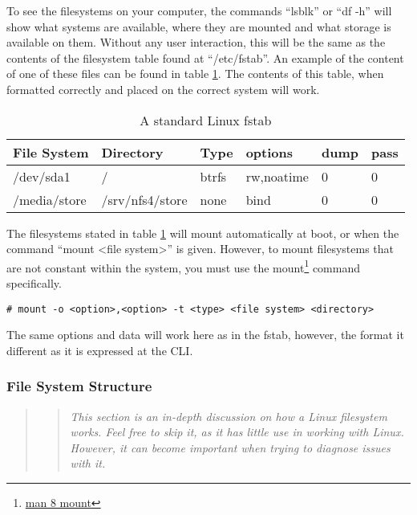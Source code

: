				To see the filesystems on your computer, the commands ``lsblk'' or ``df -h'' will show what systems are available, where they are mounted and what storage is available on them.
				Without any user interaction, this will be the same as the contents of the filesystem table found at ``/etc/fstab''.
				An example of the content of one of these files can be found in table \ref{tab:fstab}.
				The contents of this table, when formatted correctly and placed on the correct system will work.
				\begin{table}[htb]
					\centering
				\begin{adjustbox}{max width=1\textwidth}
					\begin{tabular}{l l l l l l }
						\toprule
						\textbf{File System} & \textbf{Directory} & \textbf{Type} & \textbf{options} & \textbf{dump} & \textbf{pass} \\
						\toprule
						/dev/sda1 & / & btrfs & rw,noatime & 0 & 0 \\
						/media/store & /srv/nfs4/store & none & bind & 0 & 0 \\
						\bottomrule
					\end{tabular}
				\end{adjustbox}
					\label{tab:fstab}
					\caption{A standard Linux fstab}
				\end{table}
				The filesystems stated in table \ref{tab:fstab} will mount automatically at boot, or when the command ``mount <file system>'' is given.
				However, to mount filesystems that are not constant within the system, you must use the mount\footnote{\href{http://linux.die.net/man/8/mount}{man 8 mount}} command specifically.
				\begin{lstlisting}[style=CLI]
					# mount -o <option>,<option> -t <type> <file system> <directory>
				\end{lstlisting}
				The same options and data will work here as in the fstab, however, the format it different as it is expressed at the CLI.

			\subsubsection{File System Structure}
			\begin{quote}%
				\begin{quote}
				\textit{
				This section is an in-depth discussion on how a Linux filesystem works.
				Feel free to skip it, as it has little use in working with Linux.
				However, it can become important when trying to diagnose issues with it.
				}
				\end{quote}
			\end{quote}


